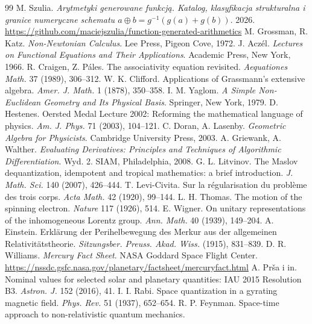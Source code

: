 \documentclass[11pt,a4paper]{article}
\begin{document}
{\footnotesize
\setlength{\itemsep}{1pt}
\begin{thebibliography}{99}
 M. Szulia.
\emph{Arytmetyki generowane funkcją. Katalog, klasyfikacja strukturalna
i granice numeryczne schematu $a\oplus b=g^{-1}(g(a)+g(b))$}. 2026.
\url{https://github.com/maciejszulia/function-generated-arithmetics}
 M. Grossman, R. Katz.
\emph{Non-Newtonian Calculus}. Lee Press, Pigeon Cove, 1972.
 J. Aczél.
\emph{Lectures on Functional Equations and Their Applications}.
Academic Press, New York, 1966.
 R. Craigen, Z. Páles.
The associativity equation revisited.
\emph{Aequationes Math.} 37 (1989), 306--312.
 W. K. Clifford.
Applications of Grassmann's extensive algebra.
\emph{Amer. J. Math.} 1 (1878), 350--358.
 I. M. Yaglom.
\emph{A Simple Non-Euclidean Geometry and Its Physical Basis}.
Springer, New York, 1979.
 D. Hestenes.
Oersted Medal Lecture 2002: Reforming the mathematical language of physics.
\emph{Am. J. Phys.} 71 (2003), 104--121.
 C. Doran, A. Lasenby.
\emph{Geometric Algebra for Physicists}. Cambridge University Press, 2003.
 A. Griewank, A. Walther.
\emph{Evaluating Derivatives: Principles and Techniques of Algorithmic
Differentiation}. Wyd. 2. SIAM, Philadelphia, 2008.
 G. L. Litvinov.
The Maslov dequantization, idempotent and tropical mathematics: a brief
introduction. \emph{J. Math. Sci.} 140 (2007), 426--444.
 T. Levi-Civita.
Sur la régularisation du problème des trois corps.
\emph{Acta Math.} 42 (1920), 99--144.
 L. H. Thomas.
The motion of the spinning electron. \emph{Nature} 117 (1926), 514.
 E. Wigner.
On unitary representations of the inhomogeneous Lorentz group.
\emph{Ann. Math.} 40 (1939), 149--204.
 A. Einstein.
Erklärung der Perihelbewegung des Merkur aus der allgemeinen
Relativitätstheorie. \emph{Sitzungsber. Preuss. Akad. Wiss.} (1915), 831--839.
 D. R. Williams.
\emph{Mercury Fact Sheet}. NASA Goddard Space Flight Center.
\url{https://nssdc.gsfc.nasa.gov/planetary/factsheet/mercuryfact.html}
 A. Prša i in.
Nominal values for selected solar and planetary quantities: IAU 2015
Resolution B3. \emph{Astron. J.} 152 (2016), 41.
 I. I. Rabi.
Space quantization in a gyrating magnetic field.
\emph{Phys. Rev.} 51 (1937), 652--654.
 R. P. Feynman.
Space-time approach to non-relativistic quantum mechanics.

\end{thebibliography}}
\end{document}
